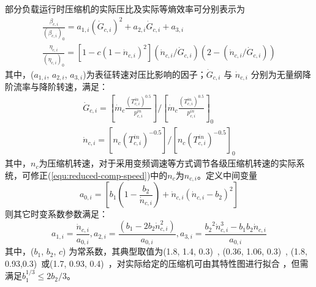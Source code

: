 部分负载运行时压缩机的实际压比及实际等熵效率可分别表示为\cite{Compressor-thermo-02,A-CAES-Dynamic-17}
\begin{subequations}
\label{eq:com-iso-eff-off}
\begin{gather}
\frac{{{\beta _{c,i}}}}{{{{({{\beta _{c,i}}})}_0}}} = {a_{1,i}}{({{{\dot G}_{c,i}}})^2} + {a_{2,i}}{\dot G_{c,i}} + {a_{3,i}}\label{equ:comp-press-part}\\
\frac{{{\eta _{c,i}}}}{{{{({{\eta _{c,i}}})}_0}}} = [{1 - c{{({1 - {{\dot n}_{c,i}}})}^2}}]({{{\dot n}_{c,i}}/{{\dot G}_{c,i}}})({2 -({{{\dot n}_{c,i}}/{{\dot G}_{c,i}}})})\label{equ:comp-eff-part}
\end{gather}
\end{subequations}
其中，($a_{1,i}$, $a_{2,i}$, $a_{3,i}$)为表征转速对压比影响的因子；${\dot G_{c,i}}$ 与 ${\dot n_{c,i}}$ 分别为无量纲降阶流率与降阶转速，满足：
\begin{subequations}
\label{eq:com-mass-off}
\begin{gather}
{\dot G_{c,i}} = [{{{\dot m}_c}\frac{{{{({T_{c,i}^{in}})}^{0.5}}}}{{p_{c,i}^{in}}}}]/{[{{{\dot m}_c}\frac{{{{({T_{c,i}^{in}})}^{0.5}}}}{{p_{c,i}^{in}}}}]_0}\label{equ:reduced-comp-mass-flow}\\
{\dot n_{c,i}} = [{{n_c}{{({T_{c,i}^{in}})}^{-0.5}}}]/{[{{n_c}{{({T_{c,i}^{in}})}^{-0.5}}}]_0}\label{equ:reduced-comp-speed}
\end{gather}
\end{subequations}
其中，$n_c$为压缩机转速，对于采用变频调速等方式调节各级压缩机转速的实际系统，可修正(\ref{equ:reduced-comp-speed})中的$n_c$为$n_{c,i}$。定义中间变量
\begin{equation}
\label{equ:comp-mid-var-1}
{a_{0,i}} = [{{b_1}({1 - \frac{{{b_2}}}{{{{\dot n}_{c,i}}}}}) + {{\dot n}_{c,i}}{{({{{\dot n}_{c,i}} - {b_2}})}^2}}]
\end{equation}
则其它时变系数参数满足：
\begin{equation}
\label{equ:comp-mid-var-2}
{a_{1,i}} = \frac{{{{\dot n}_{c,i}}}}{{{a_{0,i}}}}, {a_{2,i}} = \frac{{({{b_1} - 2{b_2}\dot n_{c,i}^2})}}{{{a_{0,i}}}}, {a_{3,i}} = \frac{{{b_2}^2\dot n_{c,i}^3 - {b_1}{b_2}{{\dot n}_{c,i}}}}{{{a_{0,i}}}}
\end{equation}
其中，($b_1$, $b_2$, $c$) 为常系数，其典型取值为(1.8, 1.4, 0.3)~\cite{Compressor-thermo-02}, (0.36, 1.06, 0.3)~\cite{A-CAES-Dynamic-17}, (1.8, 0.93,0.3)~\cite{AA-CAES-Simulation-19}或(1.7, 0.93, 0.4)~\cite{AA-CAES-Simulation-19}，对实际给定的压缩机可由其特性图进行拟合
\cite{Compressor-Off-Design-05}，但需满足$b_1^{1/3}\le 2b_2/3$。

